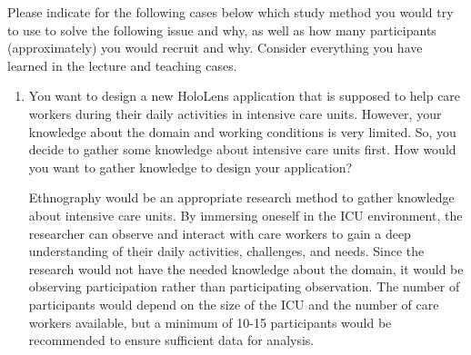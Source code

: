 \begin{ejercicio}
    Please indicate for the following cases below which study method you would try to use to solve the following issue and why, as well as how many participants (approximately) you would recruit and why. Consider everything you have learned in the lecture and teaching cases.
    \begin{enumerate}
        \item You want to design a new HoloLens application that is supposed to help care workers during their daily activities in intensive care units. However, your knowledge about the domain and working conditions is very limited. So, you decide to gather some knowledge about intensive care units first. How would you want to gather knowledge to design your application?
        
        Ethnography would be an appropriate research method to gather knowledge about intensive care units. By immersing oneself in the ICU environment, the researcher can observe and interact with care workers to gain a deep understanding of their daily activities, challenges, and needs. Since the research would not have the needed knowledge about the domain, it would be observing participation rather than participating observation. The number of participants would depend on the size of the ICU and the number of care workers available, but a minimum of 10-15 participants would be recommended to ensure sufficient data for analysis.
    \end{enumerate}
\end{ejercicio}
